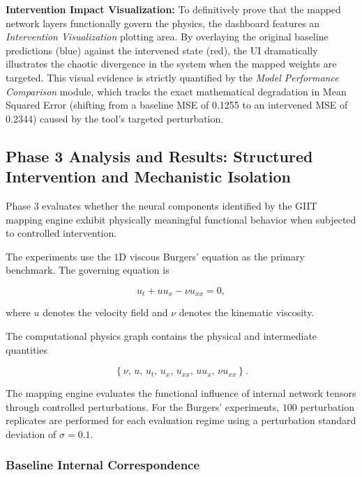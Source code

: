 \documentclass[12pt,singleside,a4paper]{article}
\begin{document}
\textbf{Intervention Impact Visualization:}
To definitively prove that the mapped network layers functionally govern the physics, the dashboard features an \textit{Intervention Visualization} plotting area. By overlaying the original baseline predictions (blue) against the intervened state (red), the UI dramatically illustrates the chaotic divergence in the system when the mapped weights are targeted. This visual evidence is strictly quantified by the \textit{Model Performance Comparison} module, which tracks the exact mathematical degradation in Mean Squared Error (shifting from a baseline MSE of 0.1255 to an intervened MSE of 0.2344) caused by the tool's targeted perturbation.


\subsection{Phase 3 Analysis and Results: Structured Intervention and
Mechanistic Isolation}

Phase 3 evaluates whether the neural components identified by the
GIIT mapping engine exhibit physically meaningful functional behavior
when subjected to controlled intervention.

The experiments use the $1$D viscous Burgers' equation as the primary
benchmark. The governing equation is

\begin{equation}
    u_t + u u_x - \nu u_{xx} = 0,
\end{equation}

where $u$ denotes the velocity field and $\nu$ denotes the kinematic
viscosity.

The computational physics graph contains the physical and intermediate
quantities

\begin{equation}
    \left\{
    \nu,\,
    u,\,
    u_t,\,
    u_x,\,
    u_{xx},\,
    uu_x,\,
    \nu u_{xx}
    \right\}.
\end{equation}

The mapping engine evaluates the functional influence of internal
network tensors through controlled perturbations. For the Burgers'
experiments, $100$ perturbation replicates are performed for each
evaluation regime using a perturbation standard deviation of
$\sigma=0.1$.


\subsubsection{Baseline Internal Correspondence}
\end{document}
